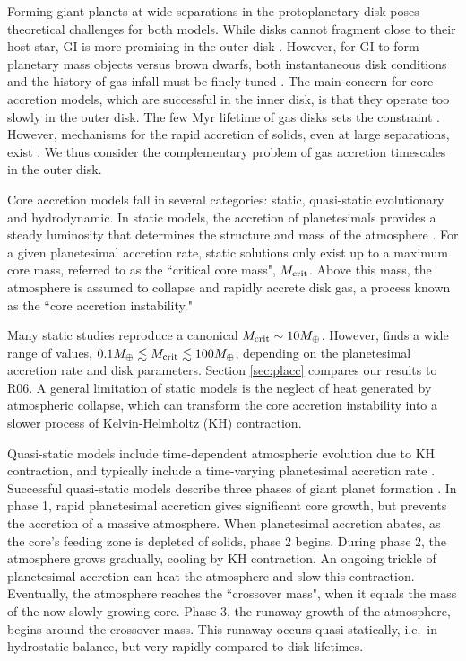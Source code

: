 \documentclass[apj, numberedappendix]{emulateapj}
\newcommand{\MC}{M_{\rm crit}}
\begin{document}
Forming giant planets at wide separations in the protoplanetary disk poses theoretical challenges for both models.  While disks cannot fragment close to their host star, GI is more promising in the outer disk \citep{matzner05, rafikov05}.   However,  for GI to form planetary mass objects versus brown dwarfs, both instantaneous disk conditions and the history of gas infall must be finely tuned \citep{kratter10}.  The main concern for core accretion models, which are successful in the inner disk, is that they operate too slowly in the outer disk. The few Myr lifetime of gas disks sets the constraint \citep{williams11}.  However, mechanisms for the rapid accretion of solids, even at large separations, exist \citep{dones93, kenyon09, lambrechts12}. We thus consider the complementary problem of gas accretion timescales in the outer disk.

Core accretion models fall in several categories: static, quasi-static evolutionary and hydrodynamic.
In static models, the accretion of planetesimals provides a steady luminosity that determines the structure and mass of the atmosphere \citep{stevenson82}.    For a given planetesimal accretion rate, static solutions only exist up to a maximum core mass, referred to as the ``critical core mass",  $\MC$. Above this mass, the atmosphere is assumed to collapse and rapidly accrete disk gas, a process known as the ``core accretion instability."

Many static studies reproduce a canonical $\MC \sim 10 M_\oplus$.  However, \citet[hereafter R06]{Raf11, rafikov06} finds a wide range of values, $0.1 M_\oplus \lesssim \MC \lesssim 100 M_\oplus$, depending on the planetesimal accretion rate and disk parameters. %
Section \ref{sec:placc} compares our results to R06.  A general limitation of static models is the neglect of heat generated by atmospheric collapse, which can transform the core accretion instability into a slower process of Kelvin-Helmholtz (KH) contraction.

Quasi-static models include time-dependent atmospheric evolution due to KH contraction, and typically include a time-varying planetesimal accretion rate \citep{boden86, alibert05}.   Successful quasi-static models describe three phases of giant planet formation \citep{pollack96}.  In phase 1, rapid planetesimal accretion gives significant core growth, but prevents the accretion of a massive atmosphere.  When planetesimal accretion abates, as the core's feeding zone is depleted of solids, phase 2 begins.  During phase 2, the atmosphere grows gradually, cooling by KH contraction.  An ongoing trickle of planetesimal accretion can heat the atmosphere and slow this contraction.  Eventually, the atmosphere reaches the ``crossover mass", when it equals the mass of the now slowly growing core.  Phase 3, the runaway growth of the atmosphere, begins around the crossover mass.  This runaway occurs quasi-statically, i.e.\ in hydrostatic balance, but very rapidly compared to disk lifetimes. 
\end{document}
